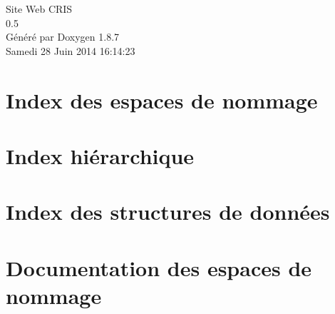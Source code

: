 \documentclass[twoside]{book}
\newcommand{\+}{\discretionary{\mbox{\scriptsize$\hookleftarrow$}}{}{}}
\newcommand{\clearemptydoublepage}{%
  \newpage{\pagestyle{empty}\cleardoublepage}%
}
\begin{document}
\hypersetup{pageanchor=false,
             bookmarks=true,
             bookmarksnumbered=true,
             pdfencoding=unicode
            }
\begin{titlepage}
\vspace*{7cm}
\begin{center}%
{\Large Site Web C\+R\+I\+S \\[1ex]\large 0.\+5 }\\
\vspace*{1cm}
{\large Généré par Doxygen 1.8.7}\\
\vspace*{0.5cm}
{\small Samedi 28 Juin 2014 16:14:23}\\
\end{center}
\end{titlepage}
\clearemptydoublepage
\tableofcontents
\clearemptydoublepage
{}
\hypersetup{pageanchor=true}

\chapter{Index des espaces de nommage}

\chapter{Index hiérarchique}

\chapter{Index des structures de données}

\chapter{Documentation des espaces de nommage}

\end{document}
